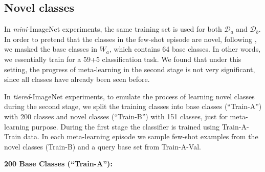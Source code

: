 \subsection{Novel classes}
In \textit{mini}-ImageNet experiments, the same training set is used for both $\mathcal{D}_a$ and
$\mathcal{D}_b$. In order to pretend that the classes in the few-shot episode are novel, following
\citet{lwof}, we masked the base classes in $W_a$, which contains 64 base classes. In other words, we
essentially train for a 59+5 classification task. We found that under this setting, the progress
of meta-learning in the second stage is not very significant, since all classes have already been
seen before.

In \textit{tiered}-ImageNet experiments, to emulate the process of learning novel classes during the
second stage, we split the training classes into base classes (``Train-A'') with 200 classes and novel classes (``Train-B'') with 151 classes, just for meta-learning purpose.
During the first stage the classifier is trained using Train-A-Train data. In each meta-learning episode we sample few-shot examples from the novel classes (Train-B) and a query base set from Train-A-Val.  

{\bf 200 Base Classes (``Train-A''):}

